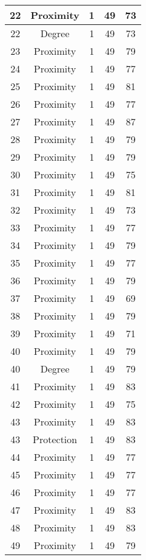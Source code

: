 \documentclass[results.tex]{subfiles}
\begin{document}
\begin{center}
\begin{tabular}{| c || c | c | c | c |}
    \hline
    22 & Proximity & 1 & 49 & 73 \\ 
    \hline
    22 & Degree & 1 & 49 & 73 \\ 
    \hline
    23 & Proximity & 1 & 49 & 79 \\ 
    \hline
    24 & Proximity & 1 & 49 & 77 \\ 
    \hline
    25 & Proximity & 1 & 49 & 81 \\ 
    \hline
    26 & Proximity & 1 & 49 & 77 \\ 
    \hline
    27 & Proximity & 1 & 49 & 87 \\ 
    \hline
    28 & Proximity & 1 & 49 & 79 \\ 
    \hline
    29 & Proximity & 1 & 49 & 79 \\ 
    \hline
    30 & Proximity & 1 & 49 & 75 \\ 
    \hline
    31 & Proximity & 1 & 49 & 81 \\ 
    \hline
    32 & Proximity & 1 & 49 & 73 \\ 
    \hline
    33 & Proximity & 1 & 49 & 77 \\ 
    \hline
    34 & Proximity & 1 & 49 & 79 \\ 
    \hline
    35 & Proximity & 1 & 49 & 77 \\ 
    \hline
    36 & Proximity & 1 & 49 & 79 \\ 
    \hline
    37 & Proximity & 1 & 49 & 69 \\ 
    \hline
    38 & Proximity & 1 & 49 & 79 \\ 
    \hline
    39 & Proximity & 1 & 49 & 71 \\ 
    \hline
    40 & Proximity & 1 & 49 & 79 \\ 
    \hline
    40 & Degree & 1 & 49 & 79 \\ 
    \hline
    41 & Proximity & 1 & 49 & 83 \\ 
    \hline
    42 & Proximity & 1 & 49 & 75 \\ 
    \hline
    43 & Proximity & 1 & 49 & 83 \\ 
    \hline
    43 & Protection & 1 & 49 & 83 \\ 
    \hline
    44 & Proximity & 1 & 49 & 77 \\ 
    \hline
    45 & Proximity & 1 & 49 & 77 \\ 
    \hline
    46 & Proximity & 1 & 49 & 77 \\ 
    \hline
    47 & Proximity & 1 & 49 & 83 \\ 
    \hline
    48 & Proximity & 1 & 49 & 83 \\ 
    \hline
    49 & Proximity & 1 & 49 & 79 \\ 
    \hline   \end{tabular}
\end{center}
\end{document}
